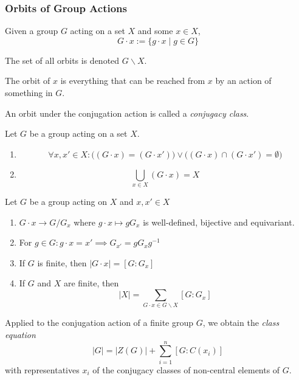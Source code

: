 \subsubsection{Orbits of Group Actions}
\begin{definition}[Orbit]
   Given a group \(G\) acting on a set \(X\) and some \(x \in X\),
   \[G \cdot x := \{g \cdot x \mid g \in G\}\]
\end{definition}
\begin{remark}[Notation]
   The set of all orbits is denoted \(G\backslash X\).
\end{remark}
\begin{remark}[Intuition]
   The orbit of \(x\) is everything that can be reached from \(x\) by an action of something in \(G\).
\end{remark}
\begin{remark}
   An orbit under the conjugation action is called a \emph{conjugacy class}.
\end{remark}

\begin{proposition}
   Let \(G\) be a group acting on a set \(X\).
   \begin{enumerate}[label=\roman*, align=Center]
      \item \[\forall x, x' \in X: \big((G \cdot x) = (G \cdot x')\big) \lor \big((G \cdot x) \cap (G \cdot x') = \emptyset\big)\]
      \item \[\bigcup_{x \in X} (G \cdot x) = X\]
   \end{enumerate}
\end{proposition}

\begin{proposition}
   Let \(G\) be a group acting on \(X\) and \(x, x' \in X\)
   \begin{enumerate}[label=\roman*, align=Center]
      \item \(G \cdot x \to G/G_x\) where \(g \cdot x \mapsto gG_x\) is well-defined, bijective and equivariant.
      \item For \(g \in G: g \cdot x = x' \implies G_{x'} = gG_xg^{-1}\)
      \item If \(G\) is finite, then \(|G \cdot x| = [G : G_x]\)
      \item If \(G\) and \(X\) are finite, then
         \[|X| = \sum_{G \cdot x \in G \backslash X} [G : G_x]\]
   \end{enumerate}
\end{proposition}
\begin{remark}
   Applied to the conjugation action of a finite group \(G\), we obtain the \emph{class equation}
   \[|G| = |Z(G)| + \sum_{i=1}^n [G : C(x_i)]\]
   with representatives \(x_i\) of the conjugacy classes of non-central elements of \(G\).
\end{remark}

